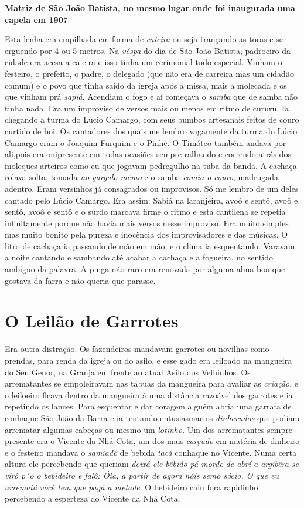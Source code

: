 \documentclass[12pt,brazil,]{book}
\begin{document}
\textbf{Matriz de São João Batista, no mesmo lugar onde foi inaugurada
uma capela em 1907}

Esta lenha era empilhada em forma de \emph{caieira} ou seja trançando as
toras e se erguendo por 4 ou 5 metros. Na \emph{véspa} do dia de São
João Batista, padroeiro da cidade era acesa a caieira e isso tinha um
cerimonial todo especial. Vinham o festeiro, o prefeito, o padre, o
delegado (que não era de carreira mas um cidadão comum) e o povo que
tinha saído da igreja após a missa, mais a molecada e os que vinham prá
\emph{sapiá}. Acendiam o fogo e aí começava o \emph{samba} que de samba
não tinha nada. Era um improviso de versos mais ou menos em ritmo de
cururu. Ia chegando a turma do Lúcio Camargo, com seus bumbos artesanais
feitos de couro curtido de boi. Os cantadores dos quais me lembro
vagamente da turma do Lúcio Camargo eram o Joaquim Furquim e o Pinhé. O
Timóteo também andava por ali,pois era onipresente em todas ocasiões
sempre ralhando e correndo atrás dos moleques arteiros como eu que
jogavam pedregulho na tuba da banda. A cachaça rolava solta, tomada
\emph{no gargalo mêmo} e o samba \emph{comia o couro}, madrugada
adentro. Eram versinhos já consagrados ou improvisos. Só me lembro de um
deles cantado pelo Lúcio Camargo. Era assim: Sabiá na laranjeira, avoô e
sentô, avoô e sentô, avoô e sentô e o surdo marcava firme o ritmo e esta
cantilena se repetia infinitamente porque não havia mais versos nesse
improviso. Era muito simples mas muito bonito pela pureza e inocência
dos improvisadores e das músicas. O litro de cachaça ia passando de mão
em mão, e o clima ia esquentando. Varavam a noite cantando e sambando
até acabar a cachaça e a fogueira, no sentido ambíguo da palavra. A
pinga não raro era renovada por alguma alma boa que gostava da farra e
não queria que parasse.

\section{O Leilão de Garrotes}\label{o-leiluxe3o-de-garrotes}

Era outra distração. Os fazendeiros mandavam garrotes ou novilhas como
prendas, para renda da igreja ou do asilo, e esse gado era leiloado na
mangueira do Seu Genor, na Granja em frente ao atual Asilo dos
Velhinhos. Os arrematantes se empoleiravam nas tábuas da mangueira para
avaliar as \emph{criação}, e o leiloeiro ficava dentro da mangueira à
uma distância razoável dos garrotes e ia repetindo os lances. Para
esquentar e dar coragem alguém abria uma garrafa de conhaque São João da
Barra e ia tentando entusiasmar os \emph{dinherudos} que podiam
arrematar algumas cabeças ou mesmo um \emph{lotinho}. Um dos
arrematantes sempre presente era o Vicente da Nhá Cota, um dos mais
\emph{carçudo} em matéria de dinheiro e o festeiro mandava o
\emph{samiadô} de bebida \emph{tacá} conhaque no Vicente. Numa certa
altura ele percebendo que queriam \emph{deixá ele bêbido pá morde de
abrí a argibêra se virô p´o o bebideiro e falô: Óia, a partir de agora
nóis semo sócio. O que eu arrematá você tem que pagá a metade}. O
bebideiro caiu fora rapidinho percebendo a esperteza do Vicente da Nhá
Cota.
\end{document}
